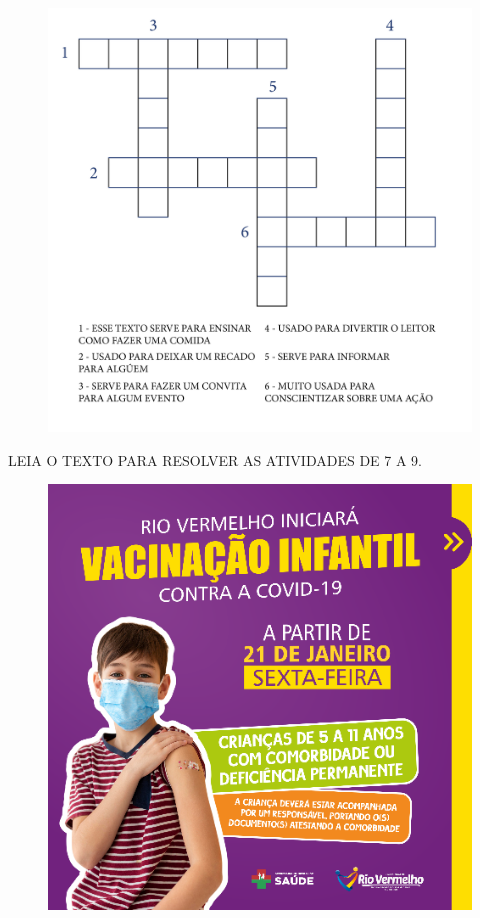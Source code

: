 \begin{figure}[H]
\centering
\includegraphics[width=1.1\textwidth]{media/image155.png}
\end{figure}

LEIA O TEXTO PARA RESOLVER AS ATIVIDADES DE 7 A 9.

\begin{figure}[H]
\centering
\includegraphics[width=\textwidth]{media/image156.png}
\end{figure}

